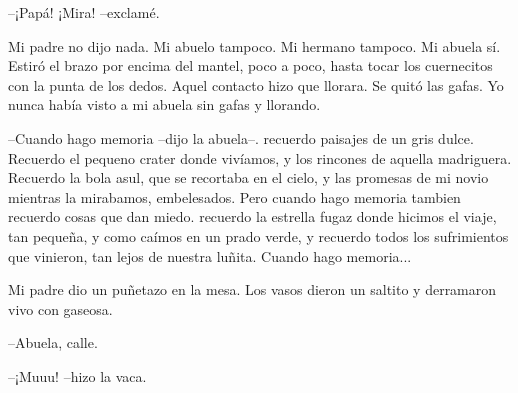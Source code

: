 \documentclass[a3paper]{tufte-handout}
\begin{document}
--¡Papá! ¡Mira! --exclamé.

Mi padre no dijo nada. Mi abuelo tampoco. Mi hermano tampoco. Mi abuela sí. Estiró el brazo por encima del mantel, poco a poco, hasta tocar los cuernecitos con la punta de los dedos. Aquel contacto hizo que llorara. Se quitó las gafas. Yo nunca había visto a mi abuela sin gafas y llorando.

--Cuando hago memoria --dijo la abuela--. recuerdo paisajes de un gris dulce. Recuerdo el pequeno crater donde vivíamos, y los rincones de aquella madriguera. Recuerdo la bola asul, que se recortaba en el cielo, y las promesas de mi novio mientras la mirabamos, embelesados. Pero cuando hago memoria tambien recuerdo cosas que dan miedo. recuerdo la estrella fugaz donde hicimos el viaje, tan pequeña, y como caímos en un prado verde, y recuerdo todos los sufrimientos que vinieron, tan lejos de nuestra luñita. Cuando hago memoria...

Mi padre dio un puñetazo en la mesa. Los vasos dieron un saltito y derramaron vivo con gaseosa.

--Abuela, calle.

--¡Muuu! --hizo la vaca.

\nocite{Albert}


\end{document}
